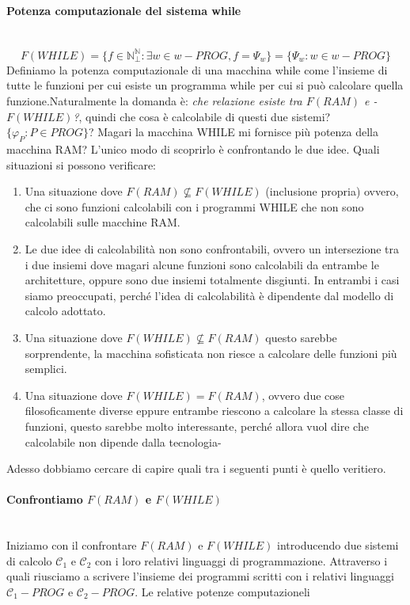 \documentclass{article}
\begin{document}
\paragraph{Potenza computazionale del sistema while}\mbox{}\\
$$F(WHILE)=\{f\in\mathbb{N}_\bot^\mathbb{N} : \exists w\in w-PROG, f=\Psi_w\}=\{\Psi_w : w\in w-PROG\}$$
Definiamo la potenza computazionale di
una macchina while come l'insieme di tutte le funzioni per cui
esiste un programma while per cui si può calcolare quella funzione.Naturalmente la domanda è: \textit{che relazione esiste tra $F(RAM)$ e -$F(WHILE)$?}, quindi
che cosa è calcolabile di questi due sistemi? $\{\varphi_P:P\in PROG\}$?
Magari la macchina WHILE mi fornisce più potenza della macchina RAM? L'unico modo di scoprirlo
è confrontando le due idee. Quali situazioni si possono verificare:
\begin{enumerate}
    \item Una situazione dove $F(RAM)\nsubseteq F(WHILE)$ (inclusione propria) ovvero, che ci sono funzioni
          calcolabili con i programmi WHILE che non sono calcolabili sulle macchine RAM.

    \item Le due idee di calcolabilità non sono confrontabili, ovvero un intersezione tra i due insiemi
          dove magari alcune funzioni sono calcolabili da entrambe le architetture, oppure sono due insiemi
          totalmente disgiunti. In entrambi i casi siamo preoccupati, perché l'idea di calcolabilità è dipendente
          dal modello di calcolo adottato.

    \item Una situazione dove $F(WHILE)\nsubseteq F(RAM)$ questo sarebbe sorprendente, la macchina
          sofisticata non riesce a calcolare delle funzioni più semplici.

    \item Una situazione dove $F(WHILE)=F(RAM)$, ovvero due cose filosoficamente diverse eppure entrambe
          riescono a calcolare la stessa classe di funzioni, questo sarebbe molto interessante, perché allora
          vuol dire che calcolabile non dipende dalla tecnologia-
\end{enumerate}
Adesso dobbiamo cercare di capire quali tra i seguenti punti è quello veritiero.

\paragraph{Confrontiamo $F(RAM)$ e $F(WHILE)$}\mbox{}\\
Iniziamo con il confrontare $F(RAM)$ e $F(WHILE)$ introducendo due sistemi di calcolo $\mathcal{C}_1$ e $\mathcal{C}_2$
con i loro relativi linguaggi di programmazione. Attraverso i quali riusciamo a scrivere l'insieme dei
programmi scritti con i relativi linguaggi $\mathcal{C}_1-PROG$ e $\mathcal{C}_2-PROG$. Le relative
potenze computazioneli
\end{document}
